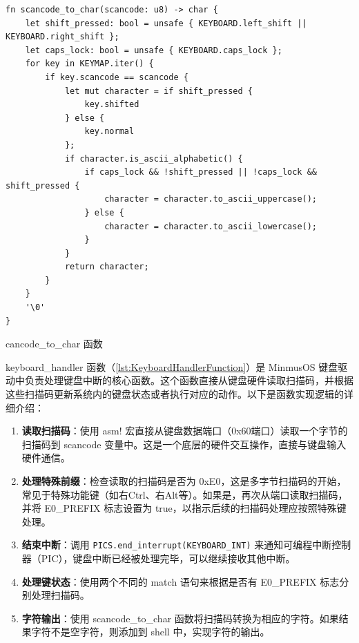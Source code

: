 \begin{listing}[htbp]
    \begin{verbatim}
fn scancode_to_char(scancode: u8) -> char {
    let shift_pressed: bool = unsafe { KEYBOARD.left_shift || KEYBOARD.right_shift };
    let caps_lock: bool = unsafe { KEYBOARD.caps_lock };
    for key in KEYMAP.iter() {
        if key.scancode == scancode {
            let mut character = if shift_pressed {
                key.shifted
            } else {
                key.normal
            };
            if character.is_ascii_alphabetic() {
                if caps_lock && !shift_pressed || !caps_lock && shift_pressed {
                    character = character.to_ascii_uppercase();
                } else {
                    character = character.to_ascii_lowercase();
                }
            }
            return character;
        }
    }
    '\0'
}
    \end{verbatim}
    \caption{cancode\_to\_char 函数}\label{lst:CancodeToCharFunction}
\end{listing}

keyboard\_handler 函数（\cref{lst:KeyboardHandlerFunction}）是 MinmusOS 键盘驱动中负责处理键盘中断的核心函数。这个函数直接从键盘硬件读取扫描码，并根据这些扫描码更新系统内的键盘状态或者执行对应的动作。以下是函数实现逻辑的详细介绍：

\begin{enumerate}
    \item \textbf{读取扫描码}：使用 asm! 宏直接从键盘数据端口（0x60端口）读取一个字节的扫描码到 scancode 变量中。这是一个底层的硬件交互操作，直接与键盘输入硬件通信。
    \item \textbf{处理特殊前缀}：检查读取的扫描码是否为 0xE0，这是多字节扫描码的开始，常见于特殊功能键（如右Ctrl、右Alt等）。如果是，再次从端口读取扫描码，并将 E0\_PREFIX 标志设置为 true，以指示后续的扫描码处理应按照特殊键处理。
    \item \textbf{结束中断}：调用 \texttt{PICS.end\_interrupt(KEYBOARD\_INT)} 来通知可编程中断控制器（PIC），键盘中断已经被处理完毕，可以继续接收其他中断。
    \item \textbf{处理键状态}：使用两个不同的 match 语句来根据是否有 E0\_PREFIX 标志分别处理扫描码。
    \item \textbf{字符输出}：使用 scancode\_to\_char 函数将扫描码转换为相应的字符。如果结果字符不是空字符，则添加到 shell 中，实现字符的输出。
\end{enumerate}

